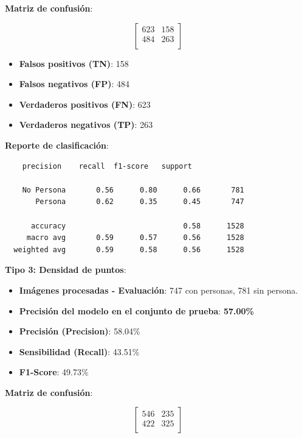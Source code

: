 \documentclass[a4paper]{article}
\begin{document}
\textbf{Matriz de confusión}:

\[
\begin{bmatrix}
    623 & 158 \\
    484 & 263 \\
\end{bmatrix}
\]

\begin{itemize}
    \item \textbf{Falsos positivos (TN)}: 158
    \item \textbf{Falsos negativos (FP)}: 484
    \item \textbf{Verdaderos positivos (FN)}: 623
    \item \textbf{Verdaderos negativos (TP)}: 263
\end{itemize}

\textbf{Reporte de clasificación}:

\begin{verbatim}
    precision    recall  f1-score   support

    No Persona       0.56      0.80      0.66       781
       Persona       0.62      0.35      0.45       747
  
      accuracy                           0.58      1528
     macro avg       0.59      0.57      0.56      1528
  weighted avg       0.59      0.58      0.56      1528
\end{verbatim}
\vspace{0.5cm}

\textbf{Tipo 3: Densidad de puntos}:

\begin{itemize}
    \item \textbf{Imágenes procesadas - Evaluación}: 747 con personas, 781 sin persona.
    \item \textbf{Precisión del modelo en el conjunto de prueba}: \textbf{57.00\%}
    \item \textbf{Precisión (Precision)}: 58.04\%
    \item \textbf{Sensibilidad (Recall)}: 43.51\%
    \item \textbf{F1-Score}: 49.73\%
\end{itemize}

\textbf{Matriz de confusión}:

\[
\begin{bmatrix}
    546 & 235 \\
    422 & 325 \\
\end{bmatrix}
\]
\end{document}
